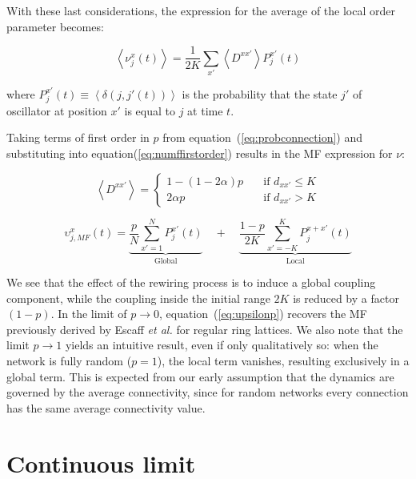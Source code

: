With these last considerations, the expression for the average of the local order parameter becomes:

\begin{equation}
	\left< \nu^x_j(t) \right> = \frac{1}{2K} \sum_{x'}\left< D^{xx'} \right> P^{x'}_j(t)
	\label{eq:numffirstorder}
\end{equation}

\noindent where $P^{x'}_j(t) \equiv \left< \delta(j,j'(t)) \right>$ is the probability that the state $j'$ of oscillator at position
$x'$ is equal to $j$ at time $t$.

Taking terms of first order in $p$ from equation~(\ref{eq:probconnection}) and substituting into equation(\ref{eq:numffirstorder})
results in the MF expression for $\nu$:

\begin{equation}
	\left< D^{xx'} \right> =
	\begin{cases}
    1-(1-2\alpha)p \quad &\text{if $d_{xx'} \leq K$}\\
    2\alpha p \quad &\text{if $d_{xx'} > K$}
	\end{cases}
\end{equation}


\begin{equation}
  \upsilon_{j,MF}^x(t) = \underbrace{\frac{p}{N}\sum_{x'=1}^N P_j^{x'}(t)}_{\text{Global}}
\quad + \quad \underbrace{\frac{1-p}{2K}\sum_{x'=-K}^K P_j^{x+x'}(t)}_{\text{Local}}
  \label{eq:upsilonp}
\end{equation}

We see that the effect of the rewiring process is to induce a global coupling component, while the coupling inside the initial range
$2K$ is reduced by a factor $(1-p)$. In the limit of $p\to 0$, equation~(\ref{eq:upsilonp}) recovers the MF previously derived by
Escaff \textit{et al.} for regular ring lattices\cite{escaff2014arrays}. We also note that the limit $p\to 1$ yields an intuitive
result, even if only qualitatively so: when the network is fully random ($p=1$), the local term vanishes, resulting exclusively in a
global term. This is expected from our early assumption that the dynamics are governed by the average connectivity, since for random
networks every connection has the same average connectivity value.

\section{Continuous limit}

